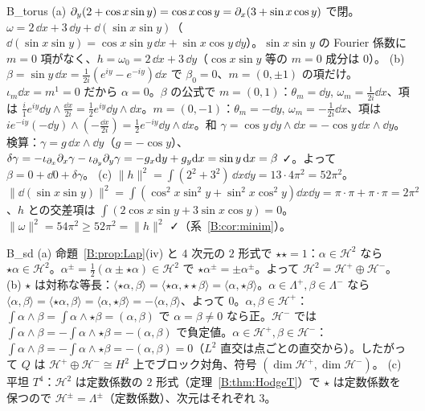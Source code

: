 \begin{soll}{B_torus}
(a) $\partial_y(2+\cos x\sin y)=\cos x\cos y=\partial_x(3+\sin x\cos y)$ で閉。$\omega=2\,\dd x+3\,\dd y+\dd(\sin x\sin y)$（$\dd(\sin x\sin y)=\cos x\sin y\,\dd x+\sin x\cos y\,\dd y$）。$\sin x\sin y$ の Fourier 係数に $m=0$ 項がなく、$h=\omega_0=2\,\dd x+3\,\dd y$（$\cos x\sin y$ 等の $m=0$ 成分は $0$）。
(b) $\beta=\sin y\,\dd x=\frac1{2i}(e^{iy}-e^{-iy})\dd x$ で $\beta_0=0$、$m=(0,\pm1)$ の項だけ。$\iota_m\dd x=m^1=0$ だから $\alpha=0$。$\beta$ の公式で $m=(0,1)$：$\theta_m=\dd y$, $\omega_m=\frac1{2i}\dd x$、項は $\frac{i}{1}e^{iy}\dd y\wedge\frac{\dd x}{2i}=\frac12e^{iy}\dd y\wedge\dd x$。$m=(0,-1)$：$\theta_m=-\dd y$, $\omega_m=-\frac1{2i}\dd x$、項は $ie^{-iy}(-\dd y)\wedge(-\frac{\dd x}{2i})=\frac12e^{-iy}\dd y\wedge\dd x$。和 $\gamma=\cos y\,\dd y\wedge\dd x=-\cos y\,\dd x\wedge\dd y$。検算：$\gamma=g\,\dd x\wedge\dd y$（$g=-\cos y$）、$\delta\gamma=-\iota_{\partial_x}\partial_x\gamma-\iota_{\partial_y}\partial_y\gamma=-g_x\mathrm{d} y+g_y\mathrm{d} x=\sin y\,\mathrm{d} x=\beta$ ✓。よって $\beta=0+\dd0+\delta\gamma$。
(c) $\|h\|^2=\int(2^2+3^2)\,\dd x\dd y=13\cdot4\pi^2=52\pi^2$。$\|\dd(\sin x\sin y)\|^2=\int(\cos^2x\sin^2y+\sin^2x\cos^2y)\dd x\dd y=\pi\cdot\pi+\pi\cdot\pi=2\pi^2$、$h$ との交差項は $\int(2\cos x\sin y+3\sin x\cos y)=0$。$\|\omega\|^2=54\pi^2\ge52\pi^2=\|h\|^2$ ✓（系~\ref{B:cor:minim}）。
\end{soll}

\begin{soll}{B_sd}
(a) 命題~\ref{B:prop:Lap}(iv) と $4$ 次元の $2$ 形式で $\star\star=1$：$\alpha\in\mathcal H^2$ なら $\star\alpha\in\mathcal H^2$。$\alpha^\pm=\frac12(\alpha\pm\star\alpha)\in\mathcal H^2$ で $\star\alpha^\pm=\pm\alpha^\pm$。よって $\mathcal H^2=\mathcal H^+\oplus\mathcal H^-$。
(b) $\star$ は対称な等長：$\langle\star\alpha,\beta\rangle=\langle\star\alpha,\star\star\beta\rangle=\langle\alpha,\star\beta\rangle$。$\alpha\in\Lambda^+,\beta\in\Lambda^-$ なら $\langle\alpha,\beta\rangle=\langle\star\alpha,\beta\rangle=\langle\alpha,\star\beta\rangle=-\langle\alpha,\beta\rangle$、よって $0$。$\alpha,\beta\in\mathcal H^+$：$\int\alpha\wedge\beta=\int\alpha\wedge\star\beta=(\alpha,\beta)$ で $\alpha=\beta\ne0$ なら正。$\mathcal H^-$ では $\int\alpha\wedge\beta=-\int\alpha\wedge\star\beta=-(\alpha,\beta)$ で負定値。$\alpha\in\mathcal H^+,\beta\in\mathcal H^-$：$\int\alpha\wedge\beta=-\int\alpha\wedge\star\beta=-(\alpha,\beta)=0$（$L^2$ 直交は点ごとの直交から）。したがって $Q$ は $\mathcal H^+\oplus\mathcal H^-\cong H^2$ 上でブロック対角、符号 $(\dim\mathcal H^+,\dim\mathcal H^-)$。
(c) 平坦 $T^4$：$\mathcal H^2$ は定数係数の $2$ 形式（定理~\ref{B:thm:HodgeT}）で $\star$ は定数係数を保つので $\mathcal H^\pm=\Lambda^\pm$（定数係数）、次元はそれぞれ $3$。
\end{soll}

